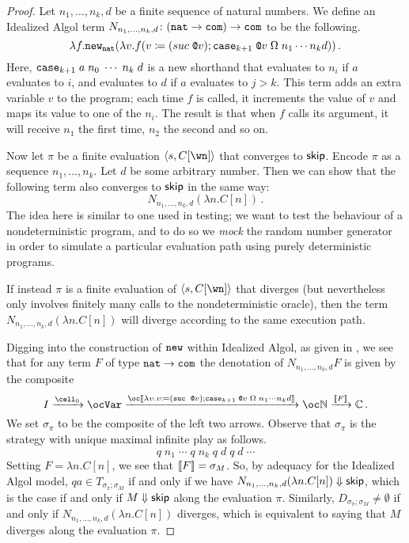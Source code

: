 \documentclass[sigplan,9pt,review]{acmart}\settopmatter{printfolios=true,printccs=false,printacmref=false}
\begin{document}
\begin{proof}
  Let $n_1,\dots,n_k,d$ be a finite sequence of natural numbers.  
  We define an Idealized Algol term $N_{n_1,\dots,n_k,d}\colon ({\mathtt{nat}} \to {\mathtt{com}}) \to {\mathtt{com}}$ to be the following.
  \[
    \lambda f.{\mathtt{new}}_{\mathtt{nat}} (\lambda v.f(v\coloneqq (suc\;\texttt{@} v); {\mathtt{case}}_{k+1}\;\texttt{@} v\;\Omega\;n_1 \cdots n_k d))\,.
    \]
  Here, ${\mathtt{case}}_{k+1}\;a\;n_0\;\cdots\;n_k\;d$ is a new shorthand that evaluates to $n_i$ if $a$ evaluates to $i$, and evaluates to $d$ if $a$ evaluates to $j> k$.
  This term adds an extra variable $v$ to the program; each time $f$ is called, it increments the value of $v$ and maps its value to one of the $n_i$.  
  The result is that when $f$ calls its argument, it will receive $n_1$ the first time, $n_2$ the second and so on.

  Now let $\pi$ be a finite evaluation $\ia s {C[\wn]}$ that converges to ${\mathsf{skip}}$.  
  Encode $\pi$ as a sequence $n_1,\dots,n_k$.  
  Let $d$ be some arbitrary number.
  Then we can show that the following term also converges to ${\mathsf{skip}}$ in the same way:
  \[
    N_{n_1,\dots,n_k,d} (\lambda n.C[n])\,.
    \]
  The idea here is similar to one used in testing; we want to test the behaviour of a nondeterministic program, and to do so we \emph{mock} the random number generator in order to simulate a particular evaluation path using purely deterministic programs.  

  If instead $\pi$ is a finite evaluation of $\ia s {C[\wn]}$ that diverges (but nevertheless only involves finitely many calls to the nondeterministic oracle), then the term $N_{n_1,\dots,n_k,d} (\lambda n.C[n])$ will diverge according to the same execution path.

  Digging into the construction of ${\mathtt{new}}$ within Idealized Algol, as given in \cite{SamsonGuyIAPassive}, we see that for any term $F$ of type ${\mathtt{nat}}\to{\mathtt{com}}$ the denotation of $N_{n_1,\dots,n_k,d} F$ is given by the composite
  \[
    I \xrightarrow{\cell_{0}}
    \oc \Var \xrightarrow{\oc\deno{\lambda v.v\coloneqq (\suc\;\deref v);\case_{k+1}\;\deref v\;\Omega\;n_1\cdots n_k d}}
    \oc\bN \xrightarrow{\deno F}
    \bC\,.
    \]
  We set $\sigma_\pi$ to be the composite of the left two arrows.  
  Observe that $\sigma_\pi$ is the strategy with unique maximal infinite play as follows.
  \[
    q\;n_1\;\cdots\;q\;n_k\;q\;d\;q\;d\;\cdots
    \]
  Setting $F = \lambda n.C[n]$, we see that $\left\llbracket F\right\rrbracket=\sigma_M$.  
  So, by adequacy for the Idealized Algol model, $qa\in T_{\sigma_\pi;\sigma_M}$ if and only if we have $N_{n_1,\dots,n_k,d} (\lambda n.C[n])\Downarrow{\mathsf{skip}}$, which is the case if and only if $M\Downarrow{\mathsf{skip}}$ along the evaluation $\pi$.
  Similarly, $D_{\sigma_\pi;\sigma_M}\neq\emptyset$ if and only if $N_{n_1,\dots,n_k,d}(\lambda n.C[n])$ diverges, which is equivalent to saying that $M$ diverges along the evaluation $\pi$.


\end{proof}
\end{document}
